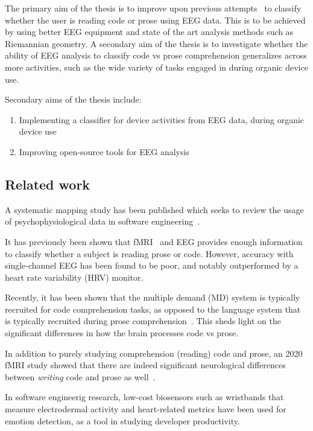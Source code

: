     The primary aim of the thesis is to improve upon previous attempts~\cite{fucci_replication_2019} to classify whether the user is reading code or prose using EEG data. This is to be achieved by using better EEG equipment and state of the art analysis methods such as Riemannian geometry. A secondary aim of the thesis is to investigate whether the ability of EEG analysis to classify code vs prose comprehension generalizes across more activities, such as the wide variety of tasks engaged in during organic device use.

    Secondary aims of the thesis include:

    \begin{enumerate}
        \item Implementing a classifier for device activities from EEG data, during organic device use
        \item Improving open-source tools for EEG analysis
    \end{enumerate}


\subsection{Related work}

    A systematic mapping study has been published which seeks to review the usage of psychophysiological data in software engineering~\cite{vieira_usage_2021}.

    It has previously been shown that fMRI~\cite{floyd_decoding_2017} and EEG\cite{fucci_replication_2019} provides enough information to classify whether a subject is reading prose or code. However, accuracy with single-channel EEG has been found to be poor, and notably outperformed by a heart rate variability (HRV) monitor.

    Recently, it has been shown that the multiple demand (MD) system is typically recruited for code comprehension tasks, as opposed to the language system that is typically recruited during prose comprehension~\cite{ivanova_comprehension_2020}. This sheds light on the significant differences in how the brain processes code vs prose.

    In addition to purely studying comprehension (reading) code and prose, an 2020 fMRI study showed that there are indeed significant neurological differences between \emph{writing} code and prose as well~\cite{noauthor_neurological_nodate}.

    In software engineerig research, low-cost biosensors such as wristbands that measure electrodermal activity and heart-related metrics have been used for emotion detection, as a tool in studying developer productivity.

